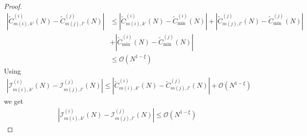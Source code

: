 \documentclass{article}
\begin{document}
\begin{proof}
\begin{align*}
     |\tilde{C}^{(i)}_{m(i),k'}(N)-\tilde{C}^{(j)}_{m(j),l'}(N)|&\leq |\tilde{C}^{(i)}_{m(i),k'}(N)-\tilde{C}^{(i)}_{\min}(N)|+|\tilde{C}^{(j)}_{m(j),l'}(N)-\tilde{C}^{(j)}_{\min}(N)| \\
     &+|\tilde{C}^{(i)}_{\min}(N)-\tilde{C}^{(j)}_{\min}(N)|\\
     & \leq \mathcal{O}(N^{1-\xi})
 \end{align*}
 Using
\begin{align*}
    |\mathcal{I}^{(i)}_{m(i),k'}(N)-\mathcal{I}^{(j)}_{m(j),l'}(N)|\leq  |\tilde{C}^{(i)}_{m(i),k'}(N)-\tilde{C}^{(j)}_{m(j),l'}(N)| + \mathcal{O}(N^{1-\xi})
\end{align*}
we get
\begin{align*}
     |\mathcal{I}^{(i)}_{m(i),k'}(N)-\mathcal{I}^{(j)}_{m(j),l'}(N)| \leq  \mathcal{O}(N^{1-\xi})
\end{align*}






\end{proof}
\end{document}
